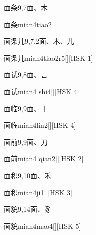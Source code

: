 \begin{entry}{面条}{9,7}{⾯、⽊}
  \begin{phonetics}{面条}{mian4tiao2}
  \end{phonetics}
\end{entry}

\begin{entry}{面条儿}{9,7,2}{⾯、⽊、⼉}
  \begin{phonetics}{面条儿}{mian4tiao2r5}[][HSK 1]
  \end{phonetics}
\end{entry}

\begin{entry}{面试}{9,8}{⾯、⾔}
  \begin{phonetics}{面试}{mian4 shi4}[][HSK 4]
  \end{phonetics}
\end{entry}

\begin{entry}{面临}{9,9}{⾯、⼁}
  \begin{phonetics}{面临}{mian4lin2}[][HSK 4]
  \end{phonetics}
\end{entry}

\begin{entry}{面前}{9,9}{⾯、⼑}
  \begin{phonetics}{面前}{mian4 qian2}[][HSK 2]
  \end{phonetics}
\end{entry}

\begin{entry}{面积}{9,10}{⾯、⽲}
  \begin{phonetics}{面积}{mian4ji1}[][HSK 3]
  \end{phonetics}
\end{entry}

\begin{entry}{面貌}{9,14}{⾯、⾘}
  \begin{phonetics}{面貌}{mian4mao4}[][HSK 5]
  \end{phonetics}
\end{entry}

